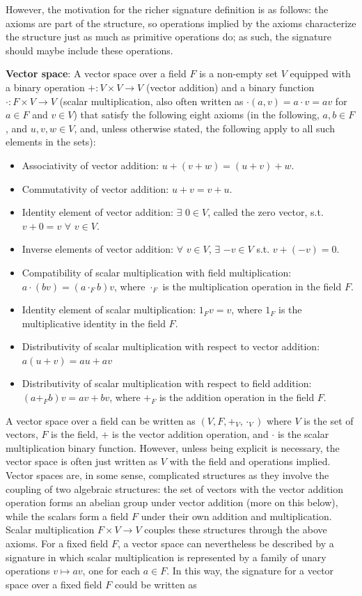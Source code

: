 However, the motivation for the richer signature definition is as follows: the axioms are part of the structure, so operations implied by the axioms characterize the structure just as much as primitive operations do; as such, the signature should maybe include these operations.

\textbf{Vector space}: A vector space over a field $F$ is a non-empty set $V$ equipped with a binary operation $+: V\times V\rightarrow V$ (vector addition) and a binary function $\cdot:F\times V\rightarrow V$ (scalar multiplication, also often written as $\cdot(a, v) = a\cdot v=av$ for $a\in F$ and $v\in V$) that satisfy the following eight axioms (in the following, $a, b\in F$, and $u, v, w\in V$, and, unless otherwise stated, the following apply to all such elements in the sets):
\begin{itemize}
    \item Associativity of vector addition: $u+(v+w)=(u+v)+w$.
    \item Commutativity of vector addition: $u+v=v+u$.
    \item Identity element of vector addition: $\exists$ $0\in V$, called the zero vector, s.t. $v + 0 = v$ $\forall$ $v\in V$.
    \item Inverse elements of vector addition: $\forall$ $v\in V$, $\exists$ $-v\in V$ s.t. $v + (-v) = 0$.
    \item Compatibility of scalar multiplication with field multiplication: $a\cdot(bv)=(a\cdot_{F}b)v$, where $\cdot_F$ is the multiplication operation in the field $F$.
    \item Identity element of scalar multiplication: $1_{F} v=v$, where $1_{F}$ is the multiplicative identity in the field $F$.
    \item Distributivity of scalar multiplication with respect to vector addition: $a (u + v) = au + av$
    \item Distributivity of scalar multiplication with respect to field addition: $(a +_{F} b)v = av + bv$, where $+_{F}$ is the addition operation in the field $F$.
\end{itemize}
A vector space over a field can be written as $(V, F, +_V, \cdot_V)$ where $V$ is the set of vectors, $F$ is the field, $+$ is the vector addition operation, and $\cdot$ is the scalar multiplication binary function. However, unless being explicit is necessary, the vector space is often just written as $V$ with the field and operations implied. Vector spaces are, in some sense, complicated structures as they involve the coupling of two algebraic structures: the set of vectors with the vector addition operation forms an abelian group under vector addition (more on this below), while the scalars form a field $F$ under their own addition and multiplication. Scalar multiplication $F\times V\rightarrow V$ couples these structures through the above axioms. For a fixed field $F$, a vector space can nevertheless be described by a signature in which scalar multiplication is represented by a family of unary operations $v\mapsto av $, one for each $a\in F$. In this way, the signature for a vector space over a fixed field $F$ could be written as
